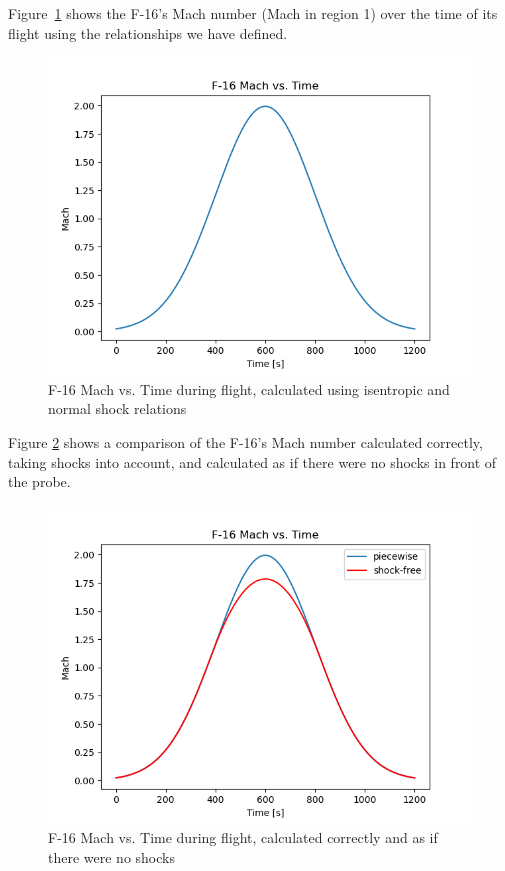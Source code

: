 \documentclass[../main.tex]{subfiles}
\begin{document}
Figure~\ref{MvsT_correct} shows the F-16's Mach number (Mach in region 1) over the time of its flight using the relationships we have defined.

\begin{figure}[h]
    \centering
    \includegraphics[scale=.7]{../images/problem_2/Mach_vs_Time_F16.png}
    \caption{F-16 Mach vs. Time during flight, calculated using isentropic and normal shock relations}
    \label{MvsT_correct}
\end{figure}

Figure \ref{MvsT_shockfree} shows a comparison of the F-16's Mach number calculated correctly, taking shocks into account, and calculated as if there were no shocks in front of the probe.

\begin{figure}[h]
    \centering
    \includegraphics[scale=.7]{../images/problem_2/Mach_vs_Time_F16_Piecewise_Simple.png}
    \caption{F-16 Mach vs. Time during flight, calculated correctly and as if there were no shocks}
    \label{MvsT_shockfree}
\end{figure}
\end{document}
